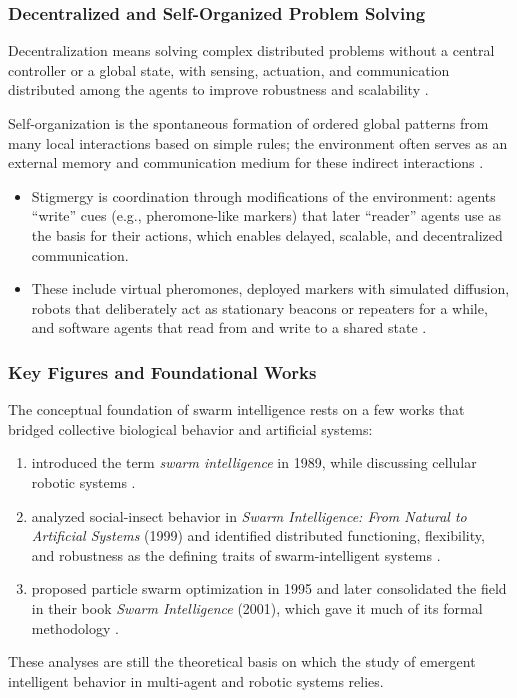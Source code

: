 \subsubsection{Decentralized and Self-Organized Problem Solving}

Decentralization means solving complex distributed problems without a central
controller or a global state, with sensing, actuation, and communication
distributed among the agents to improve robustness and scalability \cite{bonabeau1999swarm}.

Self-organization is the spontaneous formation of ordered global patterns from
many local interactions based on simple rules; the environment often serves as
an external memory and communication medium for these indirect interactions
\cite{garnier2007biological}.
\begin{itemize}
  \item {} Stigmergy is coordination
        through modifications of the environment: agents ``write'' cues (e.g.,
        pheromone-like markers) that later ``reader'' agents use as the basis
        for their actions, which enables delayed, scalable, and decentralized
        communication.
  \item {} These include virtual pheromones,
        deployed markers with simulated diffusion, robots that deliberately act
        as stationary beacons or repeaters for a while, and software agents that
        read from and write to a shared state \cite{sahin2005swarm}.
\end{itemize}

\subsubsection{Key Figures and Foundational Works}

The conceptual foundation of swarm intelligence rests on a few works that bridged
collective biological behavior and artificial systems:
\begin{enumerate}
  \item {} introduced the term \emph{swarm intelligence} in 1989,
        while discussing cellular robotic systems \cite{beni1993swarm}.
  \item {} analyzed social-insect behavior in
        \emph{Swarm Intelligence: From Natural to Artificial Systems} (1999) and
        identified distributed functioning, flexibility, and robustness as the
        defining traits of swarm-intelligent systems \cite{bonabeau1999swarm}.
  \item {} proposed particle swarm optimization in 1995
        and later consolidated the field in their book \emph{Swarm Intelligence}
        (2001), which gave it much of its formal methodology
        \cite{kennedy1995particle,kennedy2001swarm}.
\end{enumerate}
These analyses are still the theoretical basis on which the study of emergent
intelligent behavior in multi-agent and robotic systems relies.

